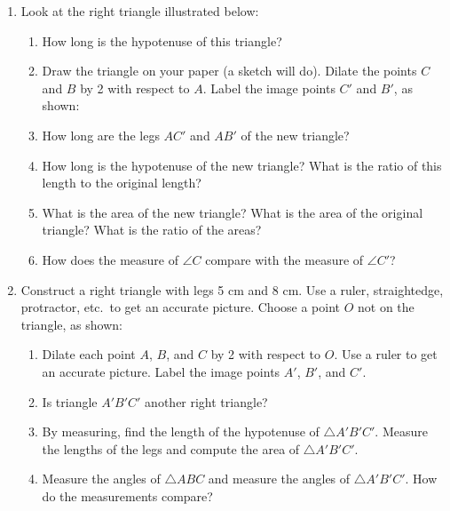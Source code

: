 \documentclass[12pt]{book} %
\begin{document}
\begin{enumerate}
\item Look at the right triangle illustrated below:


\begin{enumerate}
\item[(a)] How long is the hypotenuse of this triangle?

\item[(b)] Draw the triangle on your paper (a sketch will do). Dilate the points $C$ and $B$ by 2 with respect to $A$. Label the image points $C'$ and $B'$, as shown:


\item[(c)] How long are the legs $AC'$ and $AB'$ of the new triangle?

\item[(d)] How long is the hypotenuse of the new triangle? What is the ratio of this length to the original length?

\item[(e)] What is the area of the new triangle? What is the area of the original triangle? What is the ratio of the areas?

\item[(f)] How does the measure of $\angle C$ compare with the measure of $\angle C'$?
\end{enumerate}

\item Construct a right triangle with legs 5 cm and 8 cm. Use a ruler, straightedge, protractor, etc.\ to get an accurate picture. Choose a point $O$ not on the triangle, as shown:


\begin{enumerate}
\item[(a)] Dilate each point $A$, $B$, and $C$ by 2 with respect to $O$. Use a ruler to get an accurate picture. Label the image points $A'$, $B'$, and $C'$.

\item[(b)] Is triangle $A'B'C'$ another right triangle?

\item[(c)] By measuring, find the length of the hypotenuse of $\triangle A'B'C'$. Measure the lengths of the legs and compute the area of $\triangle A'B'C'$.

\item[(d)] Measure the angles of $\triangle ABC$ and measure the angles of $\triangle A'B'C'$. How do the measurements compare?
\end{enumerate}


\end{enumerate}
\end{document}
